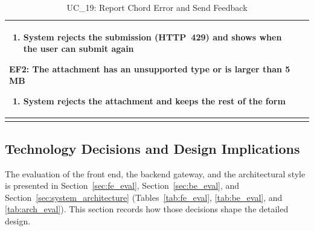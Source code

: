 \documentclass[a4paper]{article}
\newlength{\ucLeft}
\begin{document}
\begin{longtable}{|>{\bfseries}p{\ucLeft}|p{\dimexpr\linewidth-\ucLeft-2\tabcolsep-2\arrayrulewidth}|}
\begin{enumerate}[leftmargin=1.5em, nosep, topsep=2pt, partopsep=0pt, parsep=0pt, after=\strut]
    \item System rejects the submission (HTTP~429) and shows when the user can submit again
\end{enumerate}
\textbf{EF2: The attachment has an unsupported type or is larger than 5 MB}
\begin{enumerate}[leftmargin=1.5em, nosep, topsep=2pt, partopsep=0pt, parsep=0pt, after=\strut]
    \item System rejects the attachment and keeps the rest of the form
\end{enumerate}
\\ \hline
\caption{UC\_19: Report Chord Error and Send Feedback}\label{tab:uc19_userfeedback}
\end{longtable}

\subsection{Technology Decisions and Design Implications}

The evaluation of the front end, the backend gateway, and the architectural style is presented in Section~\ref{sec:fe_eval}, Section~\ref{sec:be_eval}, and Section~\ref{sec:system_architecture} (Tables~\ref{tab:fe_eval}, \ref{tab:be_eval}, and \ref{tab:arch_eval}). This section records how those decisions shape the detailed design.
\end{document}
